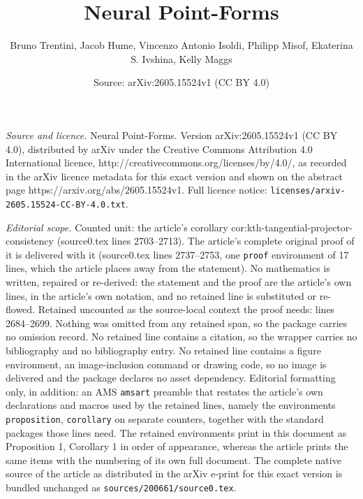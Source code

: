 \documentclass[10pt,a4paper]{amsart}
\title{Neural Point-Forms}
\author{Bruno Trentini, Jacob Hume, Vincenzo Antonio Isoldi, Philipp Misof, Ekaterina S. Ivshina, Kelly Maggs}
\date{Source: arXiv:2605.15524v1 (CC BY 4.0)}
\begin{document}
\maketitle

\noindent\emph{Source and licence.} Neural Point-Forms. Version arXiv:2605.15524v1 (CC BY 4.0), distributed by arXiv under the Creative Commons Attribution 4.0 International licence, http://creativecommons.org/licenses/by/4.0/, as recorded in the arXiv licence metadata for this exact version and shown on the abstract page https://arxiv.org/abs/2605.15524v1. Full licence notice: \texttt{licenses/arxiv-2605.15524-CC-BY-4.0.txt}.\par\smallskip

\noindent\textit{Editorial scope.} Counted unit: the article's corollary cor:kth-tangential-projector-consistency (source0.tex lines 2703--2713). The article's complete original proof of it is delivered with it (source0.tex lines 2737--2753, one \texttt{proof} environment of 17 lines, which the article places away from the statement). No mathematics is written, repaired or re-derived: the statement and the proof are the article's own lines, in the article's own notation, and no retained line is substituted or re-flowed.  Retained uncounted as the source-local context the proof needs: lines 2684--2699.  Nothing was omitted from any retained span, so the package carries no omission record.  No retained line contains a citation, so the wrapper carries no bibliography and no bibliography entry.  No retained line contains a figure environment, an image-inclusion command or drawing code, so no image is delivered and the package declares no asset dependency.  Editorial formatting only, in addition: an AMS \texttt{amsart} preamble that restates the article's own declarations and macros used by the retained lines, namely the environments \texttt{proposition}, \texttt{corollary} on separate counters, together with the standard packages those lines need.  The retained environments print in this document as Proposition 1, Corollary 1 in order of appearance, whereas the article prints the same items with the numbering of its own full document.  The complete native source of the article as distributed in the arXiv e-print for this exact version is bundled unchanged as \texttt{sources/200661/source0.tex}.
\end{document}
